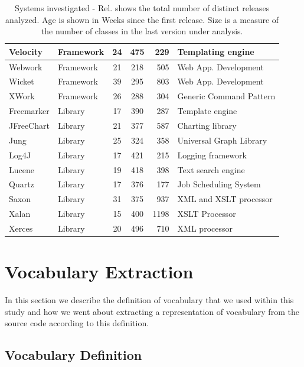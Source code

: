 \begin{table}[!]
\begin{tabular}{|l|l||c|c|r|p{}|}
\hline
Velocity&Framework&24 & 475 & 229 & Templating engine\\
\hline
Webwork&Framework&21 & 218 & 505 & Web App. Development\\
\hline
Wicket&Framework&39 & 295 & 803 & Web App. Development\\
\hline
XWork&Framework&26 & 288 & 304 & Generic Command Pattern\\
\hline
Freemarker&Library&17 & 390 & 287 & Template engine\\
\hline
JFreeChart&Library&21 & 377 & 587 & Charting library\\
\hline
Jung&Library&25 & 324 & 358 & Universal Graph Library\\
\hline
Log4J&Library&17 & 421 & 215 & Logging framework\\
\hline
Lucene&Library&19 & 418 & 398 & Text search engine\\
\hline
Quartz&Library&17 & 376 & 177 & Job Scheduling System\\
\hline
Saxon&Library&31 & 375 & 937 & XML and XSLT processor\\
\hline
Xalan&Library&15 & 400 & 1198 & XSLT Processor\\
\hline
Xerces&Library&20 & 496 & 710 & XML processor\\
\hline
\end{tabular}
\caption{Systems investigated - Rel. shows the total number of distinct releases analyzed. Age is shown in Weeks since the first release. Size is a measure of the number of classes in the last version under analysis.}
\label{tab:systems}
\end{table}



\section{Vocabulary Extraction} %
\label{sec:vocabulary_extraction}

In this section we describe the definition of vocabulary that we used within this study and how we went about extracting a representation of vocabulary from the source code according to this definition.

\subsection{Vocabulary Definition} %
\label{ssec:vocabulary_definition}

